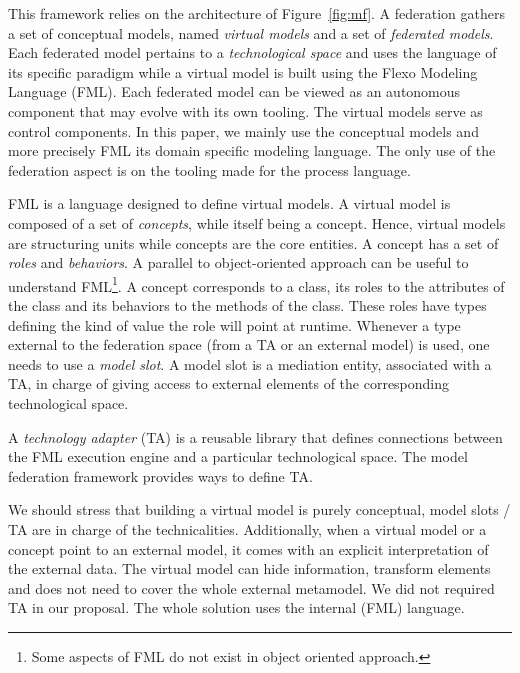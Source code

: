 This framework relies on the architecture of Figure~\ref{fig:mf}. A federation
gathers a set of conceptual models, named \emph{virtual models} and a
set of \emph{federated models}. Each federated model pertains to a
\emph{technological space} and uses the language of its specific
paradigm while a virtual model is built using the Flexo Modeling
Language (FML). Each federated model can be viewed as an autonomous
component that may evolve with its own tooling. The virtual models
serve as control components.
In this paper, we mainly use the conceptual models and more precisely FML its domain specific modeling language. The only use of the federation aspect is on the tooling made for the process language.

FML is a language designed to define virtual models. A virtual model
is composed of a set of \emph{concepts}, while itself being a concept.
Hence, virtual models are structuring units while concepts are the
core entities. A concept has a set of \emph{roles} and
\emph{behaviors}. A parallel to object-oriented approach can be useful
to understand FML\footnote{Some aspects of FML do not exist in object oriented approach.}. A concept corresponds to a class, its roles to the
attributes of the class and its behaviors to the methods of the class.
These roles have types defining the kind of value the role will point
at runtime.
Whenever a type external to the federation space (from a TA or an
external model) is used, one needs to use a \emph{model slot}. A model
slot is a mediation entity, associated with a TA, in charge of giving
access to external elements of the corresponding technological space.

A \emph{technology adapter} (TA) is a reusable library that defines
connections between the FML execution engine and a particular
technological space. The model federation framework provides ways to
define TA.

We should stress that building a virtual model is purely conceptual,
model slots / TA are in charge of the technicalities. Additionally,
when a virtual model or a concept point to an external model, it comes
with an explicit interpretation of the external data. The virtual
model can hide information, transform elements and does not need to
cover the whole external metamodel.
We did not required TA in our proposal. The whole solution uses the
internal (FML) language.

